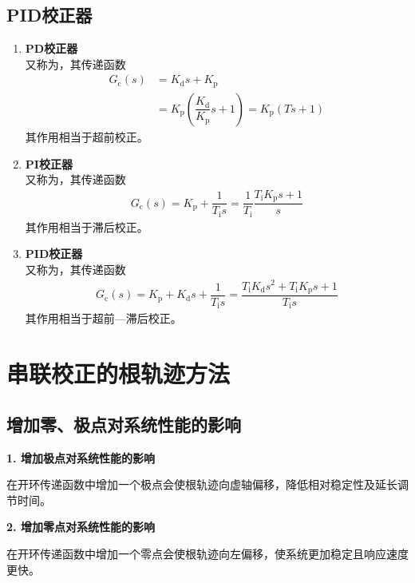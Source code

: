 \subsection{PID校正器}
\begin{enumerate}
	\item \textbf{PD校正器}\\
	又称为，其传递函数
	\begin{align}
		G_{\text{c}}(s) & = K_{\text{d}} s + K_{\text{p}}\\
		& = K_{\text{p}}\left(\dfrac{K_{\text{d}}}{K_{\text{p}}}s + 1\right) = K_{\text{p}}(Ts + 1)
	\end{align}
	其作用相当于超前校正。
	
	\item \textbf{PI校正器}\\
	又称为，其传递函数
	\begin{align}
		G_{\text{c}}(s) = K_{\text{p}}  + \dfrac{1}{T_{\text{i}} s} = \dfrac{1}{T_{\text{i}}} \dfrac{T_{\text{i}} K_{\text{p}}s + 1}{s}
	\end{align}
	其作用相当于滞后校正。
	
	\item \textbf{PID校正器}\\
	又称为，其传递函数
	\begin{align}
		G_{\text{c}}(s) = K_{\text{p}}  + K_\text{d} s +  \dfrac{1}{T_{\text{i}} s} = \dfrac{T_\text{i} K_{\text{d}}s^2 + T_\text{i} K_\text{p}s + 1}{T_{\text{i}}s}
	\end{align}
	其作用相当于超前—滞后校正。

\end{enumerate}


\section{串联校正的根轨迹方法}
\subsection{增加零、极点对系统性能的影响}
\noindent \textbf{1. 增加极点对系统性能的影响}


在开环传递函数中增加一个极点会使根轨迹向虚轴偏移，降低相对稳定性及延长调节时间。


\noindent \textbf{2. 增加零点对系统性能的影响}


在开环传递函数中增加一个零点会使根轨迹向左偏移，使系统更加稳定且响应速度更快。

